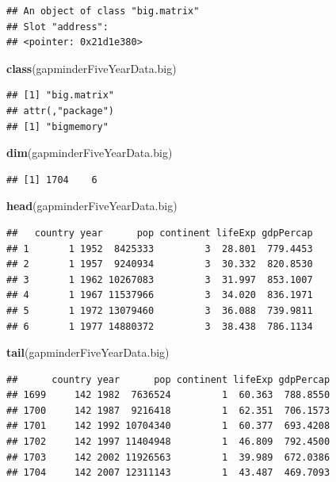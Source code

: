 \documentclass[]{article}
\newenvironment{Shaded}{\begin{snugshade}}{\end{snugshade}}
\newcommand{\KeywordTok}[1]{\textcolor[rgb]{0.13,0.29,0.53}{\textbf{{#1}}}}
\newcommand{\NormalTok}[1]{{#1}}
\begin{document}
\begin{verbatim}
## An object of class "big.matrix"
## Slot "address":
## <pointer: 0x21d1e380>
\end{verbatim}

\begin{Shaded}
\begin{Highlighting}[]
\KeywordTok{class}\NormalTok{(gapminderFiveYearData.big)}
\end{Highlighting}
\end{Shaded}

\begin{verbatim}
## [1] "big.matrix"
## attr(,"package")
## [1] "bigmemory"
\end{verbatim}

\begin{Shaded}
\begin{Highlighting}[]
\KeywordTok{dim}\NormalTok{(gapminderFiveYearData.big)}
\end{Highlighting}
\end{Shaded}

\begin{verbatim}
## [1] 1704    6
\end{verbatim}

\begin{Shaded}
\begin{Highlighting}[]
\KeywordTok{head}\NormalTok{(gapminderFiveYearData.big)}
\end{Highlighting}
\end{Shaded}

\begin{verbatim}
##   country year      pop continent lifeExp gdpPercap
## 1       1 1952  8425333         3  28.801  779.4453
## 2       1 1957  9240934         3  30.332  820.8530
## 3       1 1962 10267083         3  31.997  853.1007
## 4       1 1967 11537966         3  34.020  836.1971
## 5       1 1972 13079460         3  36.088  739.9811
## 6       1 1977 14880372         3  38.438  786.1134
\end{verbatim}

\begin{Shaded}
\begin{Highlighting}[]
\KeywordTok{tail}\NormalTok{(gapminderFiveYearData.big)}
\end{Highlighting}
\end{Shaded}

\begin{verbatim}
##      country year      pop continent lifeExp gdpPercap
## 1699     142 1982  7636524         1  60.363  788.8550
## 1700     142 1987  9216418         1  62.351  706.1573
## 1701     142 1992 10704340         1  60.377  693.4208
## 1702     142 1997 11404948         1  46.809  792.4500
## 1703     142 2002 11926563         1  39.989  672.0386
## 1704     142 2007 12311143         1  43.487  469.7093
\end{verbatim}
\end{document}
